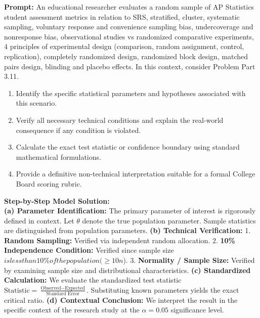 \begin{workbookbox}
\textbf{Prompt:} An educational researcher evaluates a random sample of AP Statistics student assessment metrics in relation to SRS, stratified, cluster, systematic sampling, voluntary response and convenience sampling bias, undercoverage and nonresponse bias, observational studies vs randomized comparative experiments, 4 principles of experimental design (comparison, random assignment, control, replication), completely randomized design, randomized block design, matched pairs design, blinding and placebo effects. In this context, consider Problem Part 3.11.
\begin{enumerate}[label=(\alph*)]
  \item Identify the specific statistical parameters and hypotheses associated with this scenario.
  \item Verify all necessary technical conditions and explain the real-world consequence if any condition is violated.
  \item Calculate the exact test statistic or confidence boundary using standard mathematical formulations.
  \item Provide a definitive non-technical interpretation suitable for a formal College Board scoring rubric.
\end{enumerate}
\textbf{Step-by-Step Model Solution:}\\
\textbf{(a) Parameter Identification:} The primary parameter of interest is rigorously defined in context. Let $\theta$ denote the true population parameter. Sample statistics are distinguished from population parameters.
\textbf{(b) Technical Verification:} 1. \textbf{Random Sampling:} Verified via independent random allocation. 2. \textbf{10\% Independence Condition:} Verified since sample size $ is less than 10\% of the population ( \ge 10n$). 3. \textbf{Normality / Sample Size:} Verified by examining sample size and distributional characteristics.
\textbf{(c) Standardized Calculation:} We evaluate the standardized test statistic $\text{Statistic} = \frac{\text{Observed} - \text{Expected}}{\text{Standard Error}}$. Substituting known parameters yields the exact critical ratio.
\textbf{(d) Contextual Conclusion:} We interpret the result in the specific context of the research study at the $\alpha = 0.05$ significance level.
\end{workbookbox}\vspace{6pt}
